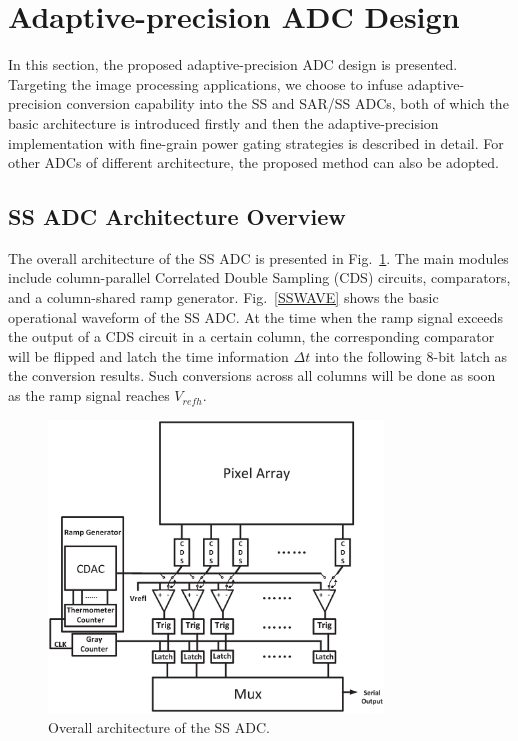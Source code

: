 \section{Adaptive-precision ADC Design}\label{architecture}

In this section, the proposed adaptive-precision ADC design is presented. Targeting the image processing applications, we choose to infuse adaptive-precision conversion capability into the SS and SAR/SS ADCs, both of which the basic architecture is introduced firstly and then the adaptive-precision implementation with fine-grain power gating strategies is described in detail. For other ADCs of different architecture, the proposed method can also be adopted.

\subsection{SS ADC Architecture Overview}

The overall architecture of the SS ADC is presented in Fig.~\ref{SSADC}. The main modules include column-parallel Correlated Double Sampling (CDS) circuits, comparators, 
and a column-shared ramp generator. Fig.~\ref{SSWAVE} shows the basic operational waveform of the SS ADC. At the time when the ramp signal exceeds the output of a CDS circuit in a certain column, 
the corresponding comparator will be flipped and latch the time information $\Delta t$ into the following 8-bit latch as the conversion results. 
Such conversions across all columns will be done as soon as the ramp signal reaches $V_{refh}$.

\begin{figure}[htbp]
	\centerline{\includegraphics[width=3.5in]{./Figures/SSADC.eps}}
	\caption{Overall architecture of the SS ADC.}
	\label{SSADC}
\end{figure} 

